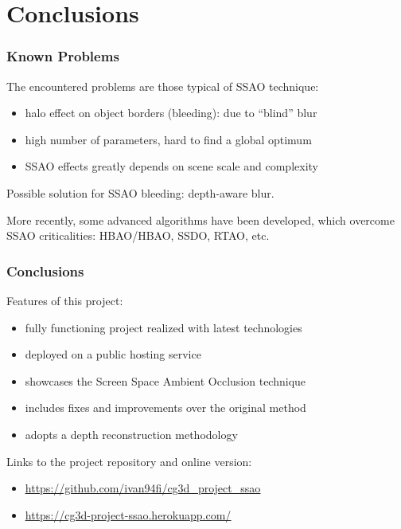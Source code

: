 \documentclass{beamer}
\newcommand{\textplus}{\raisebox{.1\height}{\scalebox{.9}{\texttt{+}}}}
\newcommand{\redtext}[1]{\textcolor{myred}{#1}}
\begin{document}
\section{Conclusions}

\begin{frame}
\frametitle{Known Problems}
The encountered problems are those typical of SSAO technique:
\begin{itemize}
    \item halo effect on object borders (\redtext{bleeding}): due to ``blind'' blur
    \item high number of \redtext{parameters}, hard to find a global optimum
    \item SSAO effects greatly depends on scene scale and complexity
\end{itemize}

Possible solution for SSAO bleeding: \redtext{depth-aware blur}.

More recently, some advanced algorithms have been developed, which overcome SSAO criticalities: HBAO/HBAO\textplus, SSDO, RTAO, etc.
\end{frame}



\begin{frame}
\frametitle{Conclusions}
Features of this project:
\begin{itemize}
    \item \redtext{fully functioning} project realized with latest technologies
    \item \redtext{deployed} on a public hosting service
    \item showcases the Screen Space Ambient Occlusion technique
    \item includes \redtext{fixes and improvements} over the original method
    \item adopts a \redtext{depth reconstruction} methodology
\end{itemize}

Links to the project repository and online version:
\begin{itemize}
    \item \redtext{\underline{\url{https://github.com/ivan94fi/cg3d_project_ssao}}}
    \item \redtext{\underline{\url{https://cg3d-project-ssao.herokuapp.com/}}}
\end{itemize}

\end{frame}

\end{document}
